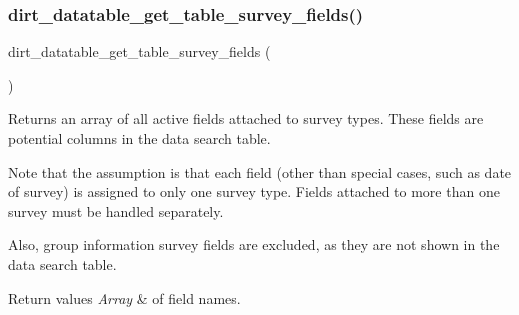 \subsubsection{\texorpdfstring{dirt\+\_\+datatable\+\_\+get\+\_\+table\+\_\+survey\+\_\+fields()}{dirt\_datatable\_get\_table\_survey\_fields()}}
{\footnotesize\ttfamily dirt\+\_\+datatable\+\_\+get\+\_\+table\+\_\+survey\+\_\+fields (\begin{DoxyParamCaption}{ }\end{DoxyParamCaption})}

Returns an array of all active fields attached to survey types. These fields are potential columns in the data search table.

Note that the assumption is that each field (other than special cases, such as date of survey) is assigned to only one survey type. Fields attached to more than one survey must be handled separately.

Also, group information survey fields are excluded, as they are not shown in the data search table.


\begin{DoxyRetVals}{Return values}
{\em Array} & of field names. \\
\hline
\end{DoxyRetVals}
